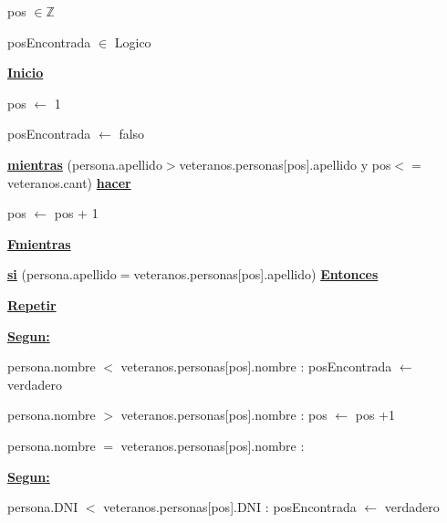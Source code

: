 \documentclass{article}
\begin{document}
            \hspace{12mm}pos $\in \mathbb{Z}$
            
            \hspace{12mm}posEncontrada $\in$ Logico
            
        \hspace{8mm}\underline{\textbf{Inicio}}

            \hspace{12mm}pos $\leftarrow$ 1

            \hspace{12mm}posEncontrada $\leftarrow$ falso

            \hspace{12mm}\underline{\textbf{mientras}} (persona.apellido$>$veteranos.personas[pos].apellido
            y pos$<=$veteranos.cant) \underline{\textbf{hacer}}

                \hspace{16mm}pos $\leftarrow$ pos + 1

            \hspace{12mm}\underline{\textbf{Fmientras}}

            \hspace{12mm}\underline{\textbf{si}} (persona.apellido$=$veteranos.personas[pos].apellido) \underline{\textbf{Entonces}}

                \hspace{16mm}\underline{\textbf{Repetir}}

                    \hspace{20mm}\underline{\textbf{Segun:}} 

                        \hspace{24mm} persona.nombre $<$ veteranos.personas[pos].nombre : posEncontrada $\leftarrow$ verdadero

                        \hspace{24mm} persona.nombre $>$ veteranos.personas[pos].nombre : pos $\leftarrow$ pos +1

                        \hspace{24mm} persona.nombre $=$ veteranos.personas[pos].nombre :

                            \hspace{28mm} \underline{\textbf{Segun:}}

                                \hspace{32mm} persona.DNI $<$ veteranos.personas[pos].DNI : posEncontrada $\leftarrow$ verdadero
\end{document}
